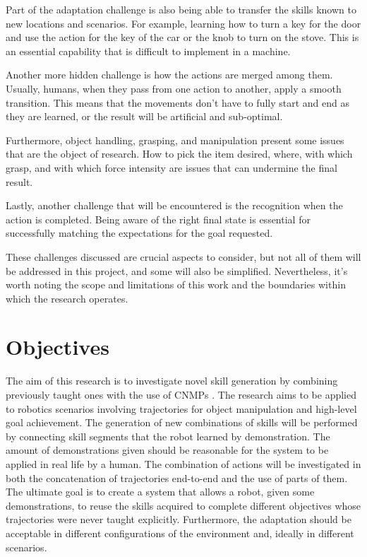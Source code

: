 Part of the adaptation challenge is also being able to transfer the skills known to new locations and scenarios. For example, learning how to turn a key for the door and use the action for the key of the car or the knob to turn on the stove. This is an essential capability that is difficult to implement in a machine.   

Another more hidden challenge is how the actions are merged among them. Usually, humans, when they pass from one action to another, apply a smooth transition. This means that the movements don't have to fully start and end as they are learned, or the result will be artificial and sub-optimal.   

Furthermore, object handling, grasping, and manipulation present some issues that are the object of research. How to pick the item desired, where,  with which grasp, and with which force intensity are issues that can undermine the final result.

Lastly, another challenge that will be encountered is the recognition when the action is completed. Being aware of the right final state is essential for successfully matching the expectations for the goal requested. 

These challenges discussed are crucial aspects to consider, but not all of them will be addressed in this project, and some will also be simplified. Nevertheless, it's worth noting the scope and limitations of this work and the boundaries within which the research operates.

\section{Objectives}
The aim of this research is to investigate novel skill generation by combining previously taught ones with the use of CNMPs \cite{Ugur-RSS-19}. 
The research aims to be applied to robotics scenarios involving trajectories for object manipulation and high-level goal achievement. 
The generation of new combinations of skills will be performed by connecting skill segments that the robot learned by demonstration. The amount of demonstrations given should be reasonable for the system to be applied in real life by a human. 
The combination of actions will be investigated in both the concatenation of trajectories end-to-end and the use of parts of them. 
The ultimate goal is to create a system that allows a robot, given some demonstrations, to reuse the skills acquired to complete different objectives whose trajectories were never taught explicitly. Furthermore, the adaptation should be acceptable in different configurations of the environment and, ideally in different scenarios.


